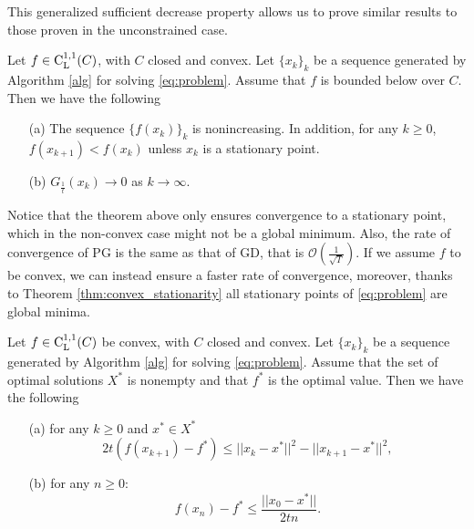 \documentclass[10pt,a4paper]{article}
\begin{document}
This generalized sufficient decrease property allows us to prove similar results to those proven in the unconstrained case.
\begin{theorem}
	Let $f\in \mathord{\mathrm{C^{1,1}_{L}}}(C)$, with $C$ closed and convex. Let $\{x_k\}_k$ be a sequence generated by Algorithm \ref{alg} for solving \eqref{eq:problem}. Assume that $f$ is bounded below over $C$. Then we have the following
	\begin{itemize}
		\item[(a)] The sequence $\{f(x_k)\}_k$ is nonincreasing. In addition, for any $k\geq 0$, $f(x_{k+1}) < f(x_k)$ unless $x_k$ is a stationary point.
		\item[(b)] $G_{\frac{1}{t}}(x_k) \to 0$ as $k\to \infty$.
	\end{itemize}
\end{theorem}
\noindent Notice that the theorem above only ensures convergence to a stationary point, which in the non-convex case might not be a global minimum. Also, the rate of convergence of PG is the same as that of GD, that is $\mathcal{O}(\frac{1}{\sqrt{T}})$. If we assume $f$ to be convex, we can instead ensure a faster rate of convergence, moreover, thanks to Theorem \ref{thm:convex_stationarity} all stationary points of \eqref{eq:problem} are global minima.
\begin{theorem}
	Let $f\in \mathord{\mathrm{C^{1,1}_{L}}}(C)$ be convex, with $C$ closed and convex. Let $\{x_k\}_k$ be a sequence generated by Algorithm \ref{alg} for solving \eqref{eq:problem}. Assume that the set of optimal solutions $X^*$ is nonempty and that $f^*$ is the optimal value. Then we have the following
	\begin{itemize}
		\item[(a)] for any $k\geq0$ and $x^*\in X^*$
		\begin{equation*}
			2t(f(x_{k+1}) -f^*) \leq ||x_k-x^*||^2 - ||x_{k+1}-x^*||^2,
		\end{equation*}
		\item[(b)] for any $n\geq 0$:
		\begin{equation*}
			f(x_n)-f^*\leq \frac{||x_0-x^*||}{2t n}.
		\end{equation*}
	\end{itemize}
\end{theorem}
\end{document}
